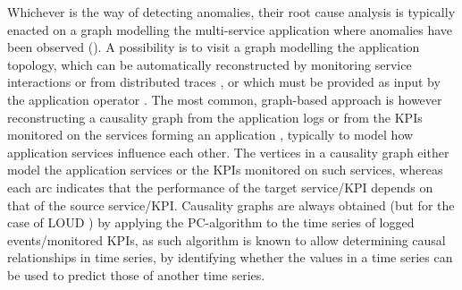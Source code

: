 Whichever is the way of detecting anomalies, their root cause analysis is typically enacted on a graph modelling the multi-service application where anomalies have been observed ().
A possibility is to visit a graph modelling the application topology, which can be automatically reconstructed by monitoring service interactions \cite{04_Wu2020_MicroRCA,09_Wu2020_MicroserviceDiagnosisDeepLearning,30_Thalheim2017_Sieve,11_Brandon2020_GraphBasedRootCauseAnalysis} or from distributed traces  \cite{21_Kim2013_RootCauseDetectionSOA,47_Liu2021_MicroHECL}, or which must be provided as input by the application operator \cite{14_Samir2019_DLA}.
The most common, graph-based approach is however reconstructing a causality graph from the application logs \cite{10_Aggarwal2020_FaultsGoldenSignals} or from the KPIs monitored on the services forming an application \cite{40_Chen2020_CauseInfer,48_Chen2014_CauseInfer,06_Lin2018_Microscope,19_Guan2019_MicroscopeDemo,29_Wang2018_CloudRanger,07_Ma2019_MSRank,25_Ma2020_MSRankExtended,08_Ma2020_AutoMAP,44_Lin2018_FacGraph,05_Meng2020_RootCausesMicroservices,46_Qiu2020_CausalityMiningKnowledgeGraph,13_Mariani2018_LocalizingFaultsCloudSystems}, typically to model how application services influence each other.
The vertices in a causality graph either model the application services \cite{40_Chen2020_CauseInfer,48_Chen2014_CauseInfer,06_Lin2018_Microscope,19_Guan2019_MicroscopeDemo,29_Wang2018_CloudRanger,07_Ma2019_MSRank,25_Ma2020_MSRankExtended,08_Ma2020_AutoMAP,44_Lin2018_FacGraph} or the KPIs \cite{05_Meng2020_RootCausesMicroservices,46_Qiu2020_CausalityMiningKnowledgeGraph,13_Mariani2018_LocalizingFaultsCloudSystems} monitored on such services, whereas each arc indicates that the performance of the target service/KPI depends on that of the source service/KPI.
Causality graphs are always obtained (but for the case of LOUD \cite{13_Mariani2018_LocalizingFaultsCloudSystems}) by applying the PC-algorithm \cite{Spirtes2000_CausationPredictionSearchPCAlgoritm} to the time series of logged events/monitored KPIs, as such algorithm is known to allow determining causal relationships in time series, \viz by identifying whether the values in a time series can be used to predict those of another time series.

